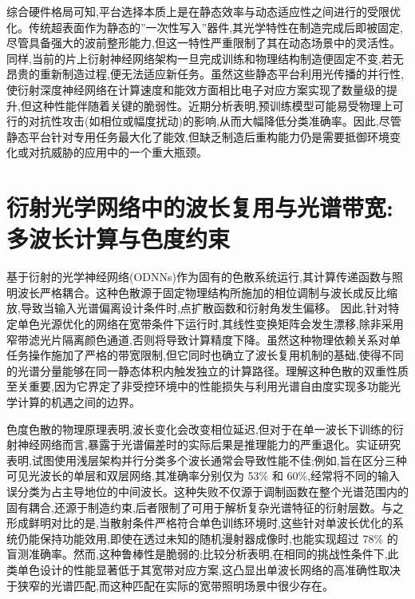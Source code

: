 综合硬件格局可知,平台选择本质上是在静态效率与动态适应性之间进行的受限优化。传统超表面作为静态的''一次性写入''器件,其光学特性在制造完成后即被固定,尽管具备强大的波前整形能力,但这一特性严重限制了其在动态场景中的灵活性。同样,当前的片上衍射神经网络架构一旦完成训练和物理结构制造便固定不变,若无昂贵的重新制造过程,便无法适应新任务。虽然这些静态平台利用光传播的并行性,使衍射深度神经网络在计算速度和能效方面相比电子对应方案实现了数量级的提升,但这种性能伴随着关键的脆弱性。近期分析表明,预训练模型可能易受物理上可行的对抗性攻击(如相位或幅度扰动)的影响,从而大幅降低分类准确率。因此,尽管静态平台针对专用任务最大化了能效,但缺乏制造后重构能力仍是需要抵御环境变化或对抗威胁的应用中的一个重大瓶颈。\citep{doi_10_1002_nap2_70185_56c8ab30} \citep{doi_10_1117_12_3109287_f4650a31} \citep{doi_10_1109_dac18074_2021_9586204_0c48190f}

\section{衍射光学网络中的波长复用与光谱带宽:多波长计算与色度约束}\label{ux884dux5c04ux5149ux5b66ux7f51ux7edcux4e2dux7684ux6ce2ux957fux590dux7528ux4e0eux5149ux8c31ux5e26ux5bbdux591aux6ce2ux957fux8ba1ux7b97ux4e0eux8272ux5ea6ux7ea6ux675f}

基于衍射的光学神经网络(ODNNs)作为固有的色散系统运行,其计算传递函数与照明波长严格耦合。这种色散源于固定物理结构所施加的相位调制与波长成反比缩放,导致当输入光谱偏离设计条件时,点扩散函数和衍射角发生偏移。\citep{doi_10_1117_1_oe_65_5_058106_f60e3d89} 因此,针对特定单色光源优化的网络在宽带条件下运行时,其线性变换矩阵会发生漂移,除非采用窄带滤光片隔离颜色通道,否则将导致计算精度下降。虽然这种物理依赖关系对单任务操作施加了严格的带宽限制,但它同时也确立了波长复用机制的基础,使得不同的光谱分量能够在同一静态体积内触发独立的计算路径。理解这种色散的双重性质至关重要,因为它界定了非受控环境中的性能损失与利用光谱自由度实现多功能光学计算的机遇之间的边界。\citep{doi_10_1038_s41598_018_30619_y_5f5bfb09} \citep{doi_10_3390_nano14221812_4d7d91b1} \citep{doi_10_1109_icton67126_2025_11125227_383c0a4a}

色度色散的物理原理表明,波长变化会改变相位延迟,但对于在单一波长下训练的衍射神经网络而言,暴露于光谱偏差时的实际后果是推理能力的严重退化。实证研究表明,试图使用浅层架构并行分类多个波长通常会导致性能不佳;例如,旨在区分三种可见光波长的单层和双层网络,其准确率分别仅为 53\% 和 60\%,经常将不同的输入误分类为占主导地位的中间波长。这种失败不仅源于调制函数在整个光谱范围内的固有耦合,还源于制造约束,后者限制了可用于解析复杂光谱特征的衍射层数。与之形成鲜明对比的是,当散射条件严格符合单色训练环境时,这些针对单波长优化的系统仍能保持功能效用,即使在透过未知的随机漫射器成像时,也能实现超过 78\% 的盲测准确率。然而,这种鲁棒性是脆弱的;比较分析表明,在相同的挑战性条件下,此类单色设计的性能显著低于其宽带对应方案,这凸显出单波长网络的高准确性取决于狭窄的光谱匹配,而这种匹配在实际的宽带照明场景中很少存在。\citep{doi_10_1002_adpr_202300310_6647aa64} \citep{doi_10_1038_s41377_023_01116_3_aba67a18}

